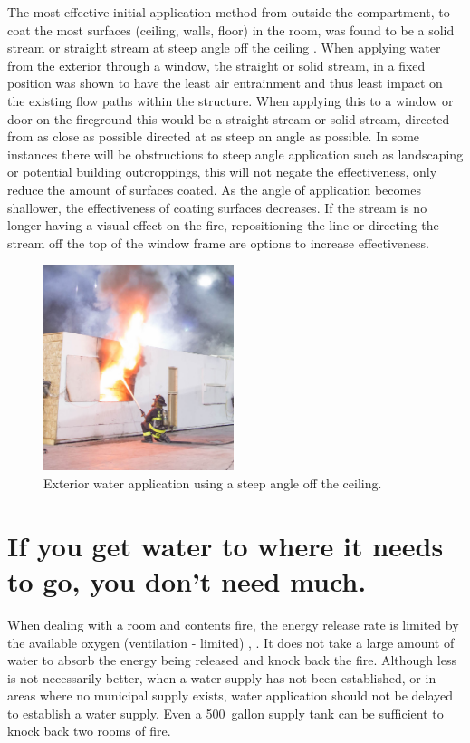 \documentclass[12pt,oneside]{book}
\begin{document}
The most effective initial application method from outside the compartment, to coat the most surfaces (ceiling, walls, floor) in the room, was found to be a solid stream or straight stream at steep angle off the ceiling \cite{Weinchenk_watermapping}. When applying water from the exterior through a window, the straight or solid stream, in a fixed position was shown to have the least air entrainment \cite{Weinchenk_airentrainment} and thus least impact on the existing flow paths within the structure. When applying this to a window or door on the fireground this would be a straight stream or solid stream, directed from as close as possible directed at as steep an angle as possible. In some instances there will be obstructions to steep angle application such as landscaping or potential building outcroppings, this will not negate the effectiveness, only reduce the amount of surfaces coated. As the angle of application becomes shallower, the effectiveness of coating surfaces decreases. If the stream is no longer having a visual effect on the fire, repositioning the line or directing the stream off the top of the window frame are options to increase effectiveness. 

\begin{figure}[H]
\centering
\includegraphics[width=0.495\textwidth]{../0_Images/Tactical_Considerations/Water_App_Direction/Exterior_Application.jpg}
\caption[Application Tactic - Exterior Attack]{Exterior water application using a steep angle off the ceiling.}
\label{fig:water_app_dir_TC_app_method}
\end{figure}

\section{If you get water to where it needs to go, you don't need much.} \label{tc:water_where_it_needs_to_go}
When dealing with a room and contents fire, the energy release rate is limited by the available oxygen (ventilation - limited) \cite{DHS2008}, \cite{DHS2010}. It does not take a large amount of water to absorb the energy being released and knock back the fire. Although less is not necessarily better, when a water supply has not been established, or in areas where no municipal supply exists, water application should not be delayed to establish a water supply. Even a 500~gallon supply tank can be sufficient to knock back two rooms of fire.    
\end{document}
